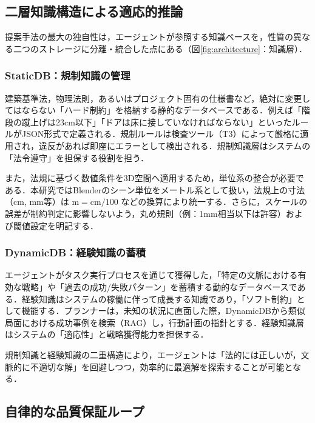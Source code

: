 \documentclass[dvipdfmx, a4paper, 9pt]{deimj}
\begin{document}
\subsection{二層知識構造による適応的推論}

提案手法の最大の独自性は，エージェントが参照する知識ベースを，性質の異なる二つのストレージに分離・統合した点にある（図\ref{fig:architecture}：知識層）．

\subsubsection{StaticDB：規制知識の管理}

建築基準法，物理法則，あるいはプロジェクト固有の仕様書など，絶対に変更してはならない「ハード制約」を格納する静的なデータベースである．例えば「階段の蹴上げは23cm以下」「ドアは床に接していなければならない」といったルールがJSON形式で定義される．規制ルールは検査ツール（T3）によって厳格に適用され，違反があれば即座にエラーとして検出される．規制知識層はシステムの「法令遵守」を担保する役割を担う．

また，法規に基づく数値条件を3D空間へ適用するため，単位系の整合が必要である．本研究ではBlenderのシーン単位をメートル系として扱い，法規上の寸法（cm, mm等）は $\text{m} = \text{cm}/100$ などの換算により統一する．さらに，スケールの誤差が制約判定に影響しないよう，丸め規則（例：1mm相当以下は許容）および閾値設定を明記する．

\subsubsection{DynamicDB：経験知識の蓄積}

エージェントがタスク実行プロセスを通じて獲得した，「特定の文脈における有効な戦略」や「過去の成功/失敗パターン」を蓄積する動的なデータベースである\cite{wang2023voyager}．経験知識はシステムの稼働に伴って成長する知識であり，「ソフト制約」として機能する．プランナーは，未知の状況に直面した際，DynamicDBから類似局面における成功事例を検索（RAG\cite{lewis2020rag}）し，行動計画の指針とする．経験知識層はシステムの「適応性」と戦略獲得能力を担保する．

規制知識と経験知識の二重構造により，エージェントは「法的には正しいが，文脈的に不適切な解」を回避しつつ，効率的に最適解を探索することが可能となる．

\subsection{自律的な品質保証ループ}
\end{document}
